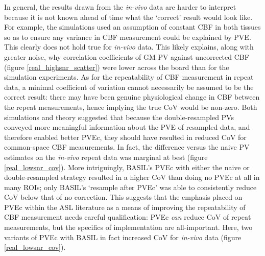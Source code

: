 In general, the results drawn from the \textit{in-vivo} data are harder to interpret because it is not known ahead of time what the `correct' result would look like. For example, the simulations used an assumption of constant CBF in both tissues so as to ensure any variance in CBF measurement could be explained by PVE. This clearly does not hold true for \textit{in-vivo} data. This likely explains, along with greater noise, why correlation coefficients of GM PV against uncorrected CBF (figure \ref{real_highsnr_scatter}) were lower across the board than for the simulation experiments. As for the repeatability of CBF measurement in repeat data, a minimal coefficient of variation cannot necessarily be assumed to be the correct result: there may have been genuine physiological change in CBF between the repeat measurements, hence implying the true CoV would be non-zero. Both simulations and theory suggested that because the double-resampled PVs conveyed more meaningful information about the PVE of resampled data, and therefore enabled better PVEc, they should have resulted in reduced CoV for common-space CBF measurements. In fact, the difference versus the naive PV estimates on the \textit{in-vivo} repeat data was marginal at best (figure \ref{real_lowsnr_cov}). More intriguingly, BASIL's PVEc with either the naive or double-resampled strategy resulted in a higher CoV than doing no PVEc at all in many ROIs; only BASIL's `resample after PVEc' was able to consistently reduce CoV below that of no correction. This suggests that the emphasis placed on PVEc within the ASL literature as a means of improving the repeatability of CBF measurement needs careful qualification: PVEc \textit{can} reduce CoV of repeat measurements, but the specifics of implementation are all-important. Here, two variants of PVEc with BASIL in fact increased CoV for \textit{in-vivo} data (figure \ref{real_lowsnr_cov}). 

